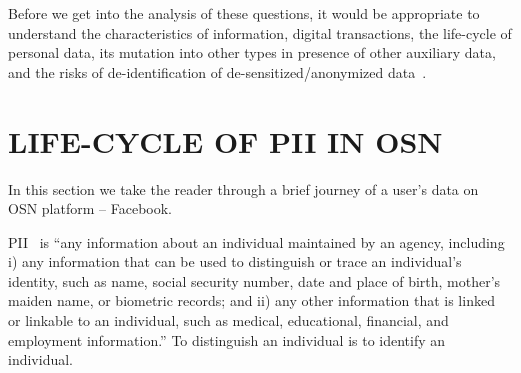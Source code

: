 \documentclass[a4paper,twoside]{article}
\begin{document}
Before we get into the analysis of these questions, it would be
appropriate to understand the characteristics of information, digital
transactions, the life-cycle of personal data, its mutation into
other types in presence of other auxiliary data, and the risks of
de-identification of de-sensitized/anonymized
data~\cite{paul-ohm-accretive}.

\section{LIFE-CYCLE OF PII IN OSN}
\label{sec:life-cycle}
\noindent In this section we take the reader through a brief journey
of a user's data on OSN platform -- Facebook.

PII~\cite{nist-pii} is ``any information about an individual
maintained by an agency, including i) any information that can be used
to distinguish or trace an individual's identity, such as name, social
security number, date and place of birth, mother's maiden name, or
biometric records; and ii) any other information that is linked or
linkable to an individual, such as medical, educational, financial,
and employment information.'' To distinguish an individual is to
identify an individual.
\end{document}

